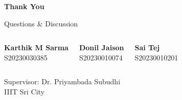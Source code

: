 \documentclass[aspectratio=169, 12pt]{beamer}
\begin{document}
\begin{frame}
    \vfill
    \centering
    {\Huge \textbf{Thank You}}

    \vspace{0.8cm}
    {\large Questions \& Discussion}

    \vspace{1cm}
    \begin{columns}
        \centering
        \textbf{Karthik M Sarma} \\ S20230030385

        \centering
        \textbf{Donil Jaison} \\ S20230010074

        \centering
        \textbf{Sai Tej} \\ S20230010201
    \end{columns}

    \vspace{0.5cm}
    \small
    Supervisor: Dr. Priyambada Subudhi \\
    IIIT Sri City
    \vfill
\end{frame}
\end{document}
